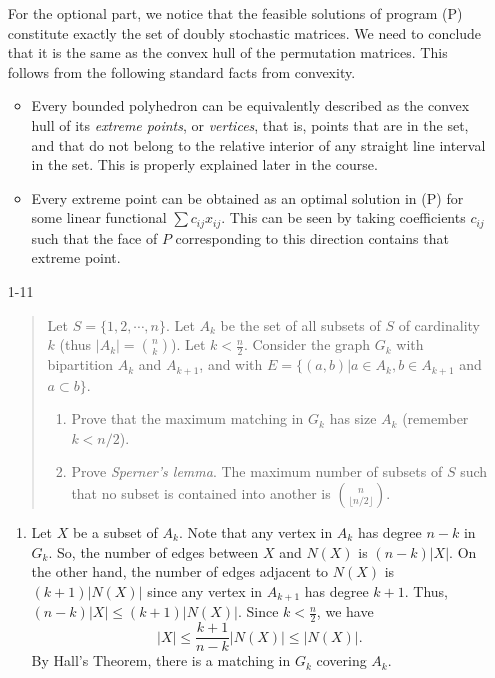 \documentclass[12pt]{article}
\begin{document}
\begin{enumerate}
For the optional part, we notice that the feasible solutions of program (P) constitute exactly the set of doubly stochastic matrices. We need to conclude that it is the same as the convex hull of the permutation matrices. This follows from the following standard facts from convexity.
\begin{itemize}
  \item Every bounded polyhedron can be equivalently described as the convex hull of its \emph{extreme points}, or \emph{vertices}, that is, points that are in the set, and that do not belong to the relative interior of any straight line interval in the set. This is properly explained later in the course.
  \item Every extreme point can be obtained as an optimal solution in (P) for some linear functional $\sum c_{ij} x_{ij}$. This can be seen by taking coefficients $c_{ij}$ such that the face of $P$ corresponding to this direction contains that extreme point. 
\end{itemize}

\item[1-11] %
\begin{quote}
Let $S=\{1,2, \cdots, n\}$. Let $A_k$ be the set of all subsets of $S$ of cardinality $k$ (thus $|A_k|={n \choose k}$). Let $k<\frac{n}{2}$. Consider the graph $G_k$ with bipartition $A_k$ and $A_{k+1}$, and with $E=\{(a,b) | a\in A_k, b\in A_{k+1}$ and $a\subset b\}$.
\begin{enumerate}
\item
Prove that the maximum matching in $G_k$ has size $A_k$ (remember $k<n/2$).
\item
Prove {\it Sperner's lemma}. The maximum number of subsets of $S$ such that no subset is contained into another is ${n \choose {\lfloor n/2 \rfloor}}$.
\end{enumerate}
\end{quote}

\begin{enumerate}
\item Let $X$ be a subset of $A_k$. Note that any vertex in $A_k$ has degree $n-k$ in $G_k$. So, the number of edges between $X$ and $N(X)$ is $(n-k)|X|$. On the other hand, the number of edges adjacent to $N(X)$ is $(k+1)|N(X)|$ since any vertex in $A_{k+1}$ has degree $k+1$. Thus, $(n-k)|X| \leq (k+1)|N(X)|$. Since $k < \frac{n}{2}$, we have
$$
|X| \leq \frac{k+1}{n-k}|N(X)| \leq |N(X)|.
$$
By Hall's Theorem, there is a matching in $G_k$ covering $A_k$.


\end{enumerate}
\end{enumerate}
\end{document}
